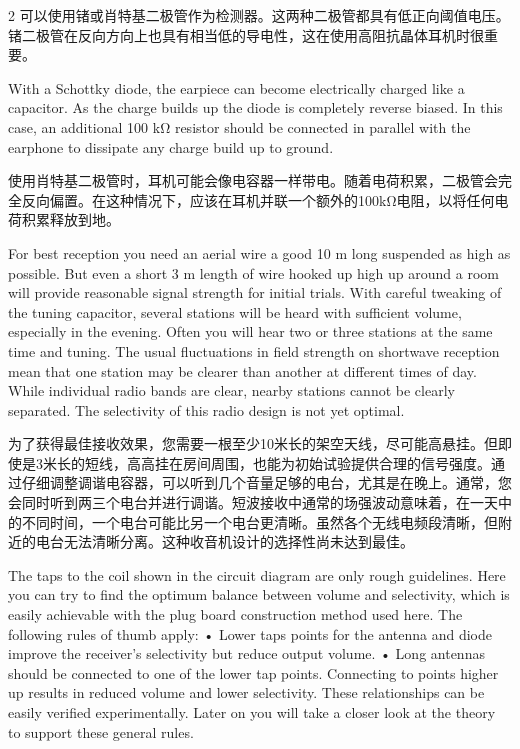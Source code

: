 \documentclass{ctexbook}
\begin{document}
\begin{paracol}{2}
可以使用锗或肖特基二极管作为检测器。这两种二极管都具有低正向阈值电压。锗二极管在反向方向上也具有相当低的导电性，这在使用高阻抗晶体耳机时很重要。

\switchcolumn*

With a Schottky diode, the earpiece can become electrically charged like a capacitor. As the 
charge builds up the diode is completely reverse biased. In this case, an additional 100 kΩ 
resistor should be connected in parallel with the earphone to dissipate any charge build up 
to ground. 

\switchcolumn

使用肖特基二极管时，耳机可能会像电容器一样带电。随着电荷积累，二极管会完全反向偏置。在这种情况下，应该在耳机并联一个额外的100kΩ电阻，以将任何电荷积累释放到地。

\switchcolumn*

For best reception you need an aerial wire a good 10 m long suspended as high as possible. 
But even a short 3 m length of wire hooked up high up around a room will provide reasonable signal strength for initial trials. With careful tweaking of the tuning capacitor, several 
stations will be heard with sufficient volume, especially in the evening. Often you will hear 
two or three stations at the same time and tuning. The usual fluctuations in field strength 
on shortwave reception mean that one station may be clearer than another at different 
times of day. While individual radio bands are clear, nearby stations cannot be clearly separated. The selectivity of this radio design is not yet optimal. 

\switchcolumn

为了获得最佳接收效果，您需要一根至少10米长的架空天线，尽可能高悬挂。但即使是3米长的短线，高高挂在房间周围，也能为初始试验提供合理的信号强度。通过仔细调整调谐电容器，可以听到几个音量足够的电台，尤其是在晚上。通常，您会同时听到两三个电台并进行调谐。短波接收中通常的场强波动意味着，在一天中的不同时间，一个电台可能比另一个电台更清晰。虽然各个无线电频段清晰，但附近的电台无法清晰分离。这种收音机设计的选择性尚未达到最佳。

\switchcolumn*

The taps to the coil shown in the circuit diagram are only rough guidelines. Here you can 
try to find the optimum balance between volume and selectivity, which is easily achievable 
with the plug board construction method used here. The following rules of thumb apply: 
• Lower taps points for the antenna and diode improve the receiver's selectivity 
but reduce output volume. 
• Long antennas should be connected to one of the lower tap points. Connecting 
to points higher up results in reduced volume and lower selectivity. 
These relationships can be easily verified experimentally. Later on you will take a closer 
look at the theory to support these general rules. 


\end{paracol}
\end{document}
